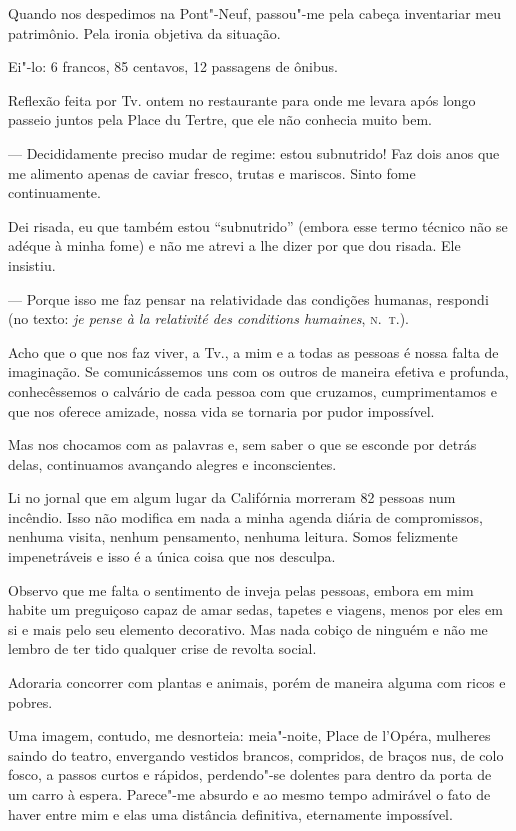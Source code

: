 Quando nos despedimos na Pont"-Neuf, passou"-me pela cabeça inventariar
meu patrimônio. Pela ironia objetiva da situação.

Ei"-lo: 6 francos, 85 centavos, 12 passagens de ônibus.

\asterisc

Reflexão feita por Tv. ontem no restaurante para onde me levara após
longo passeio juntos pela Place du Tertre, que ele não conhecia muito
bem.

--- Decididamente preciso mudar de regime: estou subnutrido! Faz dois anos que me alimento apenas de caviar fresco, trutas e mariscos. Sinto fome continuamente.

Dei risada, eu que também estou ``subnutrido'' (embora esse termo
técnico não se adéque à minha fome) e não me atrevi a lhe dizer por que
dou risada. Ele insistiu.

--- Porque isso me faz pensar na relatividade das condições humanas, respondi (no texto: \emph{je pense à la relativité des conditions humaines}, \textsc{n.~t.}).

\asterisc

Acho que o que nos faz viver, a Tv., a mim e a todas as pessoas é
nossa falta de imaginação. Se comunicássemos uns com os outros de
maneira efetiva e profunda, conhecêssemos o calvário de cada pessoa
com que cruzamos, cumprimentamos e que nos oferece amizade, nossa
vida se tornaria por pudor impossível.

Mas nos chocamos com as palavras e, sem saber o que se esconde por
detrás delas, continuamos avançando alegres e inconscientes.

Li no jornal que em algum lugar da Califórnia morreram 82 pessoas num
incêndio. Isso não modifica em nada a minha agenda diária de
compromissos, nenhuma visita, nenhum pensamento, nenhuma leitura. Somos
felizmente impenetráveis e isso é a única coisa que nos desculpa.

\asterisc

Observo que me falta o sentimento de inveja pelas pessoas, embora em mim
habite um preguiçoso capaz de amar sedas, tapetes e viagens, menos por
eles em si e mais pelo seu elemento decorativo. Mas nada cobiço de
ninguém e não me lembro de ter tido qualquer crise de revolta social.

Adoraria concorrer com plantas e animais, porém de maneira alguma com
ricos e pobres.

Uma imagem, contudo, me desnorteia: meia"-noite, Place de l'Opéra,
mulheres saindo do teatro, envergando vestidos brancos, compridos, de
braços nus, de colo fosco, a passos curtos e rápidos, perdendo"-se
dolentes para dentro da porta de um carro à espera. Parece"-me absurdo e
ao mesmo tempo admirável o fato de haver entre mim e elas uma
distância definitiva, eternamente impossível.

